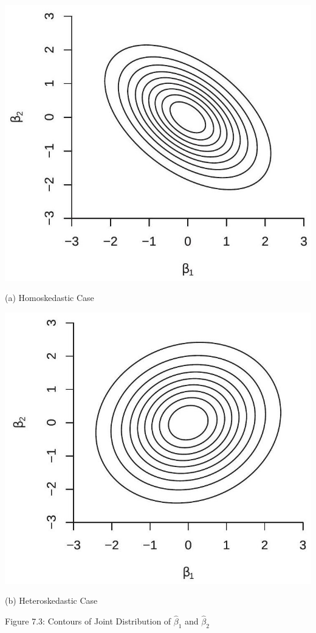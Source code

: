 \documentclass[10pt]{article}
\begin{document}
\includegraphics[max width=\textwidth]{2022_09_17_4fdd33cd9a12f3020189g-08}

(a) Homoskedastic Case

\includegraphics[max width=\textwidth]{2022_09_17_4fdd33cd9a12f3020189g-08(1)}

(b) Heteroskedastic Case

Figure 7.3: Contours of Joint Distribution of $\widehat{\beta}_{1}$ and $\widehat{\beta}_{2}$
\end{document}
